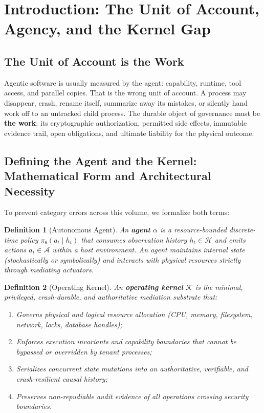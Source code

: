 \documentclass[11pt,a4paper]{article}
\newtheorem{definition}{Definition}[section]
\providecommand{\pdmarginfigure}[2]{}
\begin{document}
\section{Introduction: The Unit of Account, Agency, and the Kernel Gap}

\subsection{The Unit of Account is the Work}

\pdmarginfigure{hobbes}{Thomas Hobbes framed the sovereign Commonwealth as an artificial man; autonomous software requires the same institutional structure to prevent destructive races.}%
Agentic software is usually measured by the agent: capability, runtime, tool access, and parallel copies. That is the wrong unit of account. A process may disappear, crash, rename itself, summarize away its mistakes, or silently hand work off to an untracked child process. The durable object of governance must be \textbf{the work}: its cryptographic authorization, permitted side effects, immutable evidence trail, open obligations, and ultimate liability for the physical outcome.

\subsection{Defining the Agent and the Kernel: Mathematical Form and Architectural Necessity}

To prevent category errors across this volume, we formalize both terms:

\begin{definition}[Autonomous Agent]\label{def:agent}
An \textbf{agent} $\alpha$ is a resource-bounded discrete-time policy $\pi_\theta(a_t \mid h_t)$ that consumes observation history $h_t \in \mathcal{H}$ and emits actions $a_t \in \mathcal{A}$ within a host environment. An agent maintains internal state (stochastically or symbolically) and interacts with physical resources strictly through mediating actuators.
\end{definition}

\begin{definition}[Operating Kernel]\label{def:kernel}
An \textbf{operating kernel} $\mathcal{K}$ is the minimal, privileged, crash-durable, and authoritative mediation substrate that:
\begin{enumerate}[leftmargin=1.5em,itemsep=1.5pt]
  \item Governs physical and logical resource allocation (CPU, memory, filesystem, network, locks, database handles);
  \item Enforces execution invariants and capability boundaries that cannot be bypassed or overridden by tenant processes;
  \item Serializes concurrent state mutations into an authoritative, verifiable, and crash-resilient causal history;
  \item Preserves non-repudiable audit evidence of all operations crossing security boundaries.
\end{enumerate}
\end{definition}
\end{document}
